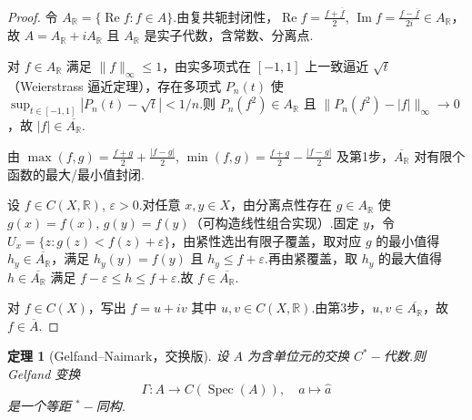 \documentclass{ctexart}
\newtheorem{theorem}{定理}[section]
\theoremstyle{plain}
\newtheorem*{proof}{证明}
\theoremstyle{plain}
\DeclareMathOperator{\Spec}{Spec}
\begin{document}
\begin{proof}
    令 $A_{\mathbb{R}} = \{\operatorname{Re}f : f \in A\}$.由复共轭封闭性，$\operatorname{Re}f = \frac{f+\overline{f}}{2}$, $\operatorname{Im}f = \frac{f-\overline{f}}{2i} \in A_{\mathbb{R}}$，故 $A = A_{\mathbb{R}} + iA_{\mathbb{R}}$ 且 $A_{\mathbb{R}}$ 是实子代数，含常数、分离点.

     对 $f \in A_{\mathbb{R}}$ 满足 $\|f\|_\infty \le 1$，由实多项式在 $[-1,1]$ 上一致逼近 $\sqrt{t}$（Weierstrass 逼近定理），存在多项式 $P_n(t)$ 使 $\sup_{t\in[-1,1]} |P_n(t) - \sqrt{t}| < 1/n$.则 $P_n(f^2) \in A_{\mathbb{R}}$ 且 $\|P_n(f^2) - |f|\|_\infty \to 0$，故 $|f| \in \overline{A_{\mathbb{R}}}$.

     由 $\max(f,g) = \frac{f+g}{2} + \frac{|f-g|}{2}$, $\min(f,g) = \frac{f+g}{2} - \frac{|f-g|}{2}$ 及第1步，$\overline{A_{\mathbb{R}}}$ 对有限个函数的最大/最小值封闭.

     设 $f \in C(X,\mathbb{R})$, $\varepsilon > 0$.对任意 $x,y \in X$，由分离点性存在 $g \in A_{\mathbb{R}}$ 使 $g(x) = f(x)$, $g(y) = f(y)$（可构造线性组合实现）.固定 $y$，令 $U_x = \{z : g(z) < f(z) + \varepsilon\}$，由紧性选出有限子覆盖，取对应 $g$ 的最小值得 $h_y \in \overline{A_{\mathbb{R}}}$，满足 $h_y(y) = f(y)$ 且 $h_y \le f + \varepsilon$.再由紧覆盖，取 $h_y$ 的最大值得 $h \in \overline{A_{\mathbb{R}}}$ 满足 $f - \varepsilon \le h \le f + \varepsilon$.故 $f \in \overline{A_{\mathbb{R}}}$.

     对 $f \in C(X)$，写出 $f = u + iv$ 其中 $u,v \in C(X,\mathbb{R})$.由第3步，$u,v \in \overline{A_{\mathbb{R}}}$，故 $f \in \overline{A}$.
\end{proof}

\begin{theorem}[Gelfand--Naimark，交换版]\label{thm:gn-commutative}
    设 $A$ 为含单位元的交换 $C^*-\!$代数.则 Gelfand 变换
    \begin{equation}
        \Gamma: A \longrightarrow C(\Spec(A)), \quad a \longmapsto \widehat{a}
    \end{equation}
    是一个等距 ${}^*-\!$同构.
\end{theorem}
\end{document}
